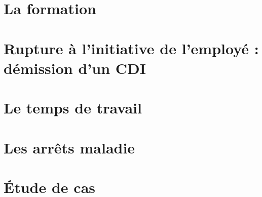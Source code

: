 \documentclass[a4paper,10pt]{article}
\theoremstyle{remark}
\begin{document}
\section{La formation}
	

\section{Rupture à l’initiative de l’employé : démission d'un CDI}
	

\section{Le temps de travail}
	

\section{Les arrêts maladie}
	

\section{Étude de cas}
	
\end{document}
